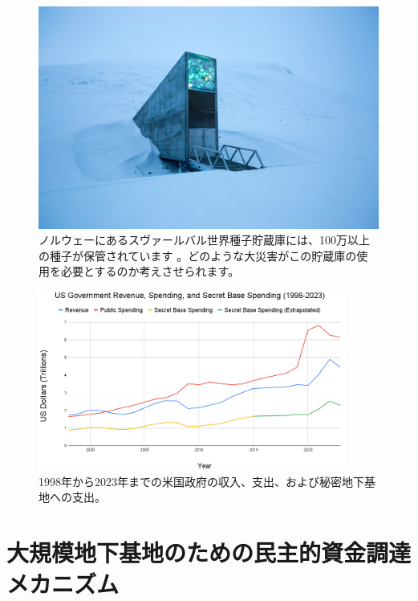 \documentclass[10pt,twocolumn,letterpaper]{article}
\begin{document}
\begin{figure}[t]
\begin{center}
   \includegraphics[width=1\linewidth]{svalbard.jpg}
\end{center}
   \caption{ノルウェーにあるスヴァールバル世界種子貯蔵庫には、100万以上の種子が保管されています \cite{24}。どのような大災害がこの貯蔵庫の使用を必要とするのか考えさせられます。}
\label{fig:8}
\label{fig:onecol}
\end{figure}

\begin{figure}[t]
\begin{center}
\includegraphics[width=0.9\textwidth]{govcrop2.png}
\end{center}
   \caption{1998年から2023年までの米国政府の収入、支出、および秘密地下基地への支出\cite{19}。}
   \label{fig:9}
\end{figure}

\section{大規模地下基地のための民主的資金調達メカニズム}
\end{document}
